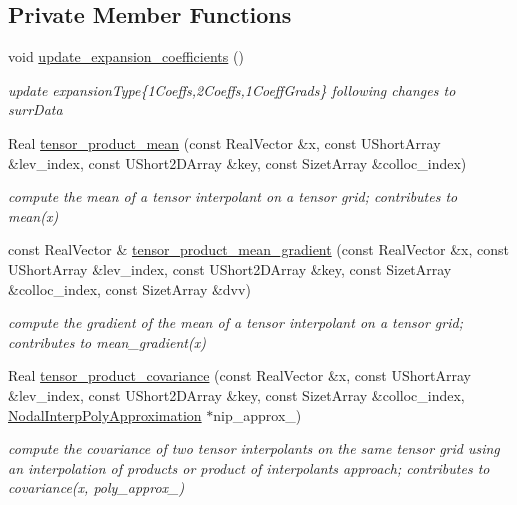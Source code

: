 \subsection*{Private Member Functions}
\begin{DoxyCompactItemize}
\item 
void \hyperlink{classPecos_1_1NodalInterpPolyApproximation_a462bc6aefbe884d10284098edb819534}{update\+\_\+expansion\+\_\+coefficients} ()\label{classPecos_1_1NodalInterpPolyApproximation_a462bc6aefbe884d10284098edb819534}

\begin{DoxyCompactList}\small\item\em update expansion\+Type\{1\+Coeffs,2\+Coeffs,1\+Coeff\+Grads\} following changes to surr\+Data \end{DoxyCompactList}\item 
Real \hyperlink{classPecos_1_1NodalInterpPolyApproximation_a688440d598a119d9b059aa0199886c75}{tensor\+\_\+product\+\_\+mean} (const Real\+Vector \&x, const U\+Short\+Array \&lev\+\_\+index, const U\+Short2\+D\+Array \&key, const Sizet\+Array \&colloc\+\_\+index)
\begin{DoxyCompactList}\small\item\em compute the mean of a tensor interpolant on a tensor grid; contributes to mean(x) \end{DoxyCompactList}\item 
const Real\+Vector \& \hyperlink{classPecos_1_1NodalInterpPolyApproximation_ac8b724a720250bb907f8828b3d2f6979}{tensor\+\_\+product\+\_\+mean\+\_\+gradient} (const Real\+Vector \&x, const U\+Short\+Array \&lev\+\_\+index, const U\+Short2\+D\+Array \&key, const Sizet\+Array \&colloc\+\_\+index, const Sizet\+Array \&dvv)
\begin{DoxyCompactList}\small\item\em compute the gradient of the mean of a tensor interpolant on a tensor grid; contributes to mean\+\_\+gradient(x) \end{DoxyCompactList}\item 
Real \hyperlink{classPecos_1_1NodalInterpPolyApproximation_ad34fcf2d6c6841648fa93e0e8e6bef78}{tensor\+\_\+product\+\_\+covariance} (const Real\+Vector \&x, const U\+Short\+Array \&lev\+\_\+index, const U\+Short2\+D\+Array \&key, const Sizet\+Array \&colloc\+\_\+index, \hyperlink{classPecos_1_1NodalInterpPolyApproximation}{Nodal\+Interp\+Poly\+Approximation} $\ast$nip\+\_\+approx\+\_)
\begin{DoxyCompactList}\small\item\em compute the covariance of two tensor interpolants on the same tensor grid using an interpolation of products or product of interpolants approach; contributes to covariance(x, poly\+\_\+approx\+\_) \end{DoxyCompactList}\item 

\end{DoxyCompactItemize}
